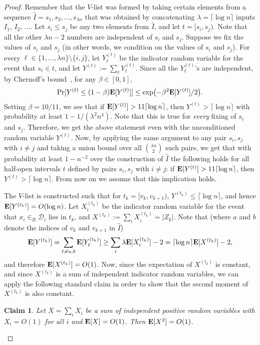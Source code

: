 \documentclass{siamltex}
\newcommand{\D}{\mathcal{D}}
\newcommand{\EX}{\hbox{\bf E}}
\newcommand{\eqdef}{:=}
\newtheorem{claim}[theorem]{Claim}
\begin{document}
\begin{proof} 
Remember that the $V$-list was formed by taking certain elements from a 
sequence $\hat I = s_1, s_2, \ldots,  s_{\lambda n}$ that was
obtained by concatenating $\lambda = \lceil \log n \rceil$ inputs 
$I_1$, $I_2$, $\ldots$.
Let $s_i \leq s_j$ be any two elements from $\hat I$, and
let $t = [s_i,s_j)$.
Note that all the other $\lambda n - 2$ numbers are
independent of $s_i$ and $s_j$.  Suppose we fix the values of $s_i$ and $s_j$
(in other words, we condition on the values of $s_i$ and $s_j$). For every 
$\ell \in \{1, \ldots, \lambda n\} \setminus \{i,j\}$, let
$Y^{(t)}_\ell$ be the indicator random variable for the event that 
$s_\ell \in t$, and let $Y^{(t)} \eqdef \sum_\ell Y^{(t)}_\ell$.  
Since all the
$Y^{(t)}_\ell$'s are independent, by Chernoff's 
bound~\cite[Theorem~4.2]{MotwaniRa95}, for any
$\beta \in [0,1]$,  
\begin{equation}\label{equ:chernoff}
\Pr[Y^{(t)} \leq (1-\beta)\EX[Y^{(t)}]] \leq 
\exp\bigl(-\beta^2\EX[Y^{(t)}]/2\bigr). 
\end{equation}
Setting $\beta = 10/11$, we see that
 if $\EX[Y^{(t)}] > 11\lceil\log n\rceil$,
then $Y^{(t)} > \lceil\log n\rceil$ with probability at least
$1 - 1/(\lambda^2n^4)$.
Note that this is true for \emph{every} fixing of $s_i$ and $s_j$.
Therefore, we get the above statement even with the unconditioned
random variable $Y^{(t)}$.
Now, by applying  the same argument
to any pair $s_i, s_j$ with $i \neq j$ and taking a union bound over all
$\binom{\lambda n}{2}$ such pairs, we get that with probability at 
least $1 - n^{-2}$ over the construction of $\hat I$
the following holds for all half-open intervals $t$ defined by pairs 
$s_i, s_j$ with $i \not= j$:
if $\EX[Y^{(t)}] > 11\lceil\log n\rceil$, then
$Y^{(t)} > \lceil \log n \rceil$. From now on we assume that this 
implication holds.

The $V$-list is constructed such that for $t_k = [v_k, v_{k+1})$, $Y^{(t_k)}
\leq \lceil\log n\rceil$, and hence 
$\EX[Y^{(t_k)}] = O(\log n)$.  Let $X^{(t_k)}_i$ be the indicator random 
variable 
for the event that $x_i \in_R \D_i$ lies in $t_k$, and $X^{(t_k)} \eqdef \sum_i
X^{(t_k)}_i = |Z_k|$.  Note that (where $a$ and $b$ denote the indices of 
$v_k$ and $v_{k+1}$ in $\hat I$)
\[
\EX[Y^{(t_k)}]  = 
\sum_{\ell \neq a, b}
\EX[Y^{(t_k)}_\ell]  \geq
\sum_{i} \lambda \EX[X^{(t_k)}_i] - 2
= \lceil \log n\rceil  \EX[X^{(t_k)}] -2,
\]
and therefore $\EX[X^{(t_k)}] =
O(1)$. Now, since the expectation of $X^{(t_k)}$ is constant, and
since $X^{(t_k)}$ is a sum of independent indicator random variables,
we can apply the following standard claim in order to show that the
second moment of $X^{(t_k)}$ is also constant.
\medskip
\begin{claim}\label{clm:indicator-square}
Let $X = \sum_i X_i$ be a sum of independent positive random variables with
$X_i = O(1)$ for all $i$ and $\EX[X] = O(1)$. Then $\EX[X^2] = O(1)$.
\end{claim}


\end{proof}
\end{document}
